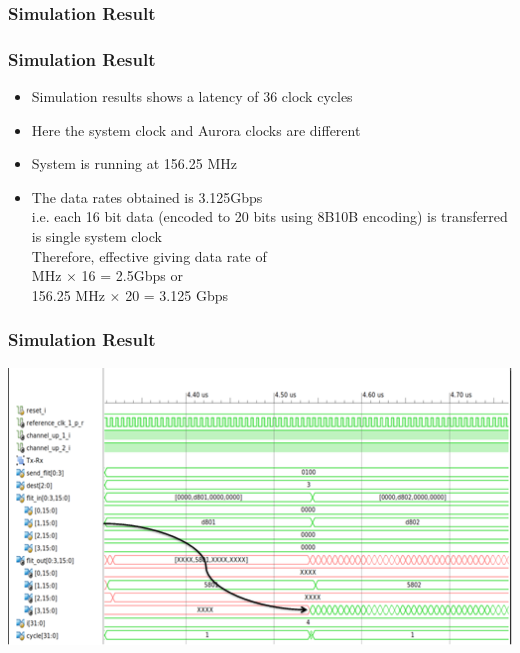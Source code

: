 \subsubsection{Simulation Result}
\begin{frame}
\frametitle{Simulation Result}
\begin{itemize}
\item Simulation results shows a latency of 36 clock cycles
\item Here the system clock and Aurora clocks are different
\item System is running at 156.25 MHz 
\item The data rates obtained is 3.125Gbps \\
i.e. each 16 bit data (encoded to 20 bits using 8B10B encoding) is transferred is single system clock \\
Therefore, effective giving data rate of \\
 MHz $\times$ 16 = 2.5Gbps or \\
156.25 MHz $\times$ 20 = 3.125 Gbps
\end{itemize}
\end{frame}

\begin{frame}
\frametitle{Simulation Result}
	\centering
	\includegraphics[scale=0.7]{./figs/AuroraSimulation}
\end{frame}

